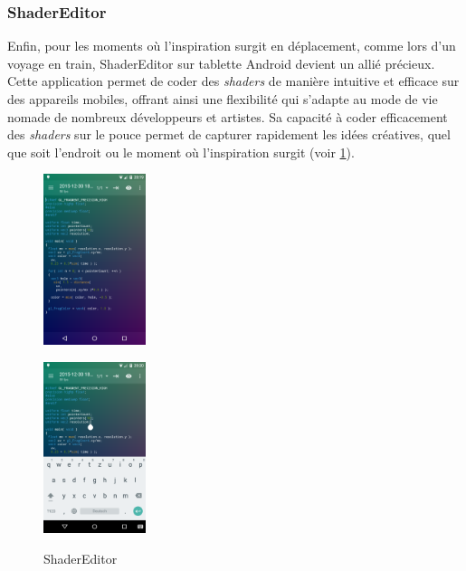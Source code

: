 \subsubsection*{ShaderEditor}

Enfin, pour les moments où l'inspiration surgit en déplacement, comme lors d'un voyage en train, ShaderEditor sur tablette Android devient un allié précieux. Cette application permet de coder des \textit{shaders} de manière intuitive et efficace sur des appareils mobiles, offrant ainsi une flexibilité qui s'adapte au mode de vie nomade de nombreux développeurs et artistes. Sa capacité à coder efficacement des \textit{shaders} sur le pouce permet de capturer rapidement les idées créatives, quel que soit l'endroit ou le moment où l'inspiration surgit (voir \ref{outilsshadSE}).

\begin{figure}[h]
  \begin{minipage}[b]{0.45\linewidth}
    \centering
    \includegraphics[height=5cm]{images/livecoding/outilsshad04.png}
    \label{outilsshad04}
  \end{minipage}
  \hfill
  \begin{minipage}[b]{0.45\linewidth}
    \centering
    \includegraphics[height=5cm]{images/livecoding/outilsshad05.png}
    \label{outilsshad05}
  \end{minipage}  
  \caption{ShaderEditor}
  
    \label{outilsshadSE}
\end{figure}


